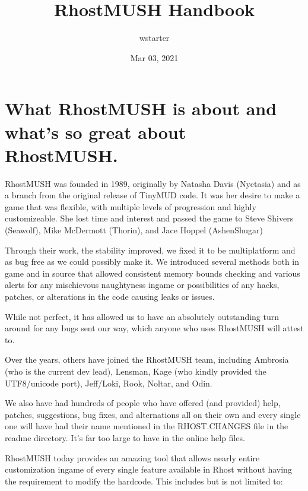 \documentclass[letterpaper,10pt,english]{sphinxmanual}
\title{RhostMUSH Handbook}
\date{Mar 03, 2021}
\author{wstarter}
\begin{document}
\pagestyle{empty}
\sphinxmaketitle
\pagestyle{plain}
\sphinxtableofcontents
\pagestyle{normal}
\label{\detokenize{index::doc}}



\chapter{What RhostMUSH is about and what’s so great about RhostMUSH.}
\label{\detokenize{01-intro:what-rhostmush-is-about-and-what-s-so-great-about-rhostmush}}\label{\detokenize{01-intro::doc}}
\sphinxAtStartPar
RhostMUSH was founded in 1989, originally by Natasha Davis (Nyctasia) and as
a branch from the original release of TinyMUD code.  It was her desire to make
a game that was flexible, with multiple levels of progression and highly
customizeable.  She lost time and interest and passed the game to
Steve Shivers (Seawolf), Mike McDermott (Thorin), and Jace Hoppel (Ashen\sphinxhyphen{}Shugar)

\sphinxAtStartPar
Through their work, the stability improved, we fixed it to be multi\sphinxhyphen{}platform
and as bug free as we could possibly make it.  We introduced several methods both
in game and in source that allowed consistent memory bounds checking and
various alerts for any mischievous naughtyness in\sphinxhyphen{}game or possibilities of any
hacks, patches, or alterations in the code causing leaks or issues.

\sphinxAtStartPar
While not perfect, it has allowed us to have an absolutely outstanding
turn around for any bugs sent our way, which anyone who uses RhostMUSH will
attest to.

\sphinxAtStartPar
Over the years, others have joined the RhostMUSH team, including Ambrosia
(who is the current dev lead), Lensman, Kage (who kindly provided the
UTF8/unicode port), Jeff/Loki, Rook, Noltar, and Odin.

\sphinxAtStartPar
We also have had hundreds of people who have offered (and provided) help,
patches, suggestions, bug fixes, and alternations all on their own and
every single one will have had their name mentioned in the RHOST.CHANGES
file in the readme directory.  It’s far too large to have in the online
help files.

\sphinxAtStartPar
RhostMUSH today provides an amazing tool that allows nearly entire
customization in\sphinxhyphen{}game of every single feature available in Rhost without
having the requirement to modify the hardcode.  This includes but is
not limited to:
\end{document}
